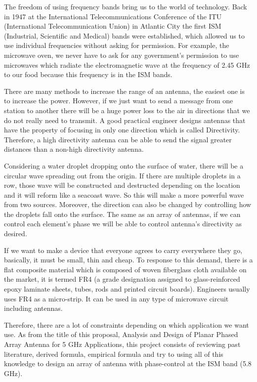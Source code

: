 \documentclass[11pt,a4paper]{article}
\begin{document}
	The freedom of using frequency bands bring us to the world of technology. Back in 1947 at the International Telecommunications Conference of the ITU  (International Telecommunication Union) in Atlantic City the first ISM (Industrial, Scientific and Medical) bands were established, which allowed us to use individual frequencies without asking for permission. For example, the microwave oven, we never have to ask for any government's permission to use microwaves which radiate the electromagnetic wave at the frequency of 2.45 GHz to our food because this  frequency is in the ISM bands.

	There are many methods to increase the range of an antenna, the easiest one is to increase the power. However, if we just want to send a message from one station to another there will be a huge power loss to the air in directions that we do not really need to transmit. A good practical engineer designs antennas that have the property of focusing in only one direction which is called Directivity. Therefore, a high directivity antenna can be able to send the signal greater distances than a non-high directivity antenna.

    Considering a water droplet dropping onto the surface of water, there will be a circular wave spreading out from the origin.  If there are multiple droplets in a row, those wave will be constructed and destructed depending on the location and it will reform like a seacoast wave. So this will make a more powerful wave from two sources. Moreover, the direction can also be changed by controlling how the droplets fall onto the surface. The same as an array of antennas, if we can control each  element's phase we will be able to control antenna's directivity as desired. 

    If we want to make a device that everyone agrees to carry everywhere they go, basically, it must be small, thin and cheap. To response to this demand, there is a flat composite material which is composed of woven fiberglass cloth available on the market, it is termed FR4 (a grade designation assigned to glass-reinforced epoxy laminate sheets, tubes, rods and printed circuit boards).
            Engineers usually uses FR4 as a micro-strip. It can be used in any type of microwave circuit including antennas.

    Therefore, there are a lot of constraints depending on which application we want use. As from the title of this proposal,  Analysis and Design of Planar Phased Array Antenna for 5 GHz Applications, this project consists of reviewing past literature, derived formula, empirical formula and try to using all of this knowledge to design an array of antenna with phase-control at the ISM band (5.8 GHz).
\end{document}
